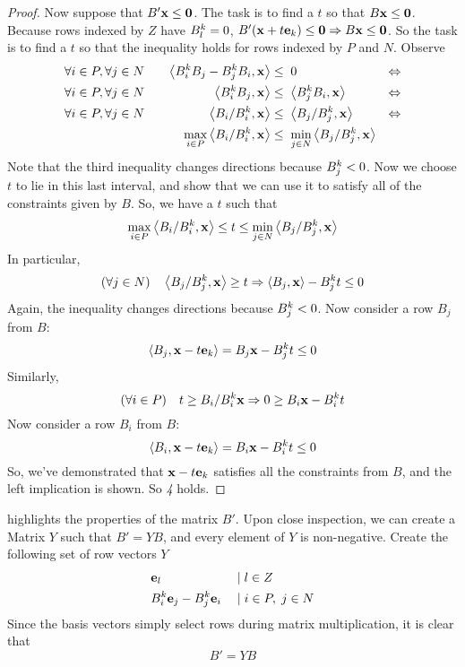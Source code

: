 \begin{proof}
	Now suppose that $B'\mathbf{x} \leq \mathbf{0}$.  The task is to find a $t$ so that $B\mathbf{x} \leq \mathbf{0}$.  Because rows indexed by $Z$ have $B^k_l = 0$, $B'(\mathbf{x}+t\mathbf{e}_k) \leq \mathbf{0} \Rightarrow B\mathbf{x} \leq \mathbf{0}$.  So the task is to find a $t$ so that the inequality holds for rows indexed by $P$ and $N$.  Observe
	\begin{alignat*}{3}
		\forall i\in P,\forall j \in N & \quad & \left\langle B^k_i B_j - B^k_j B_i, \mathbf{x} \right\rangle    & \leq  \; 0                                & \Leftrightarrow \\
		\forall i\in P,\forall j \in N & \quad & \left\langle B^k_i B_j, \mathbf{x} \right\rangle               & \leq  \; \left\langle B^k_j B_i, \mathbf{x} \right\rangle                & \Leftrightarrow \\
		\forall i\in P,\forall j \in N & \quad & \left\langle B_i/B^k_i, \mathbf{x} \right\rangle               & \leq  \; \left\langle B_j/B^k_j, \mathbf{x} \right\rangle                & \Leftrightarrow \\
		      & \quad & \max_{i\in P} \left\langle B_i/B^k_i, \mathbf{x} \right\rangle & \leq  \; \min_{j\in N}  \left\langle B_j/B^k_j, \mathbf{x} \right\rangle &
	\end{alignat*}
	Note that the third inequality changes directions because $B^k_j < 0$.  Now we choose $t$ to lie in this last interval, and show that we can use it to satisfy all of the constraints given by $ B$.  So, we have a $t$ such that
	\[ \max_{i\in P} \left\langle B_i/B^k_i, \mathbf{x} \right\rangle \leq t \leq \min_{j\in N} \left\langle B_j/B^k_j, \mathbf{x} \right\rangle \]
	In particular,
  \[(\forall j\in N)\quad \left\langle B_j/B^k_j, \mathbf{x} \right\rangle \geq t \Rightarrow \left\langle B_j, \mathbf{x} \right\rangle - B^k_j t \leq 0\]
	Again, the inequality changes directions because $B^k_j < 0$.  Now consider a row $ B_j$ from $ B$:
	\[ \left\langle B_j, \mathbf{x}-t\mathbf{e}_k \right\rangle =  B_j {\mathbf{x}} - B^k_j t \leq 0 \]
	Similarly,
  \[(\forall i\in P)\quad t \geq B_i/B^k_i {\mathbf{x}} \Rightarrow 0 \geq B_i {\mathbf{x}} - B^k_i t\]
	Now consider a row $ B_i$ from $ B$:
	\[ \left\langle B_i, \mathbf{x}-t\mathbf{e}_k \right\rangle =  B_i {\mathbf{x}} - B^k_i t \leq 0 \]
	So, we've demonstrated that $\mathbf{x}-t\mathbf{e}_k$ satisfies all the constraints from $B$, and the left implication is shown.  So \textit{4} holds.
\end{proof}

\begin{Remark}\label{fm_matrix}
	  highlights the properties of the matrix $B'$.  Upon close inspection, we can create a Matrix $Y$ such that $B' = YB$, and every element of $Y$ is non-negative.  Create the following set of row vectors $Y$
	\begin{alignat*}{2}
		 & \mathbf{e}_l                  & \;|\; & l \in Z          \\
		 & B^k_i \mathbf{e}_j - B^k_j \mathbf{e}_i & \;|\; & i\in P,\; j\in N
	\end{alignat*}
	Since the basis vectors simply select rows during matrix multiplication, it is clear that
	\[ B' = YB \]
\end{Remark}

